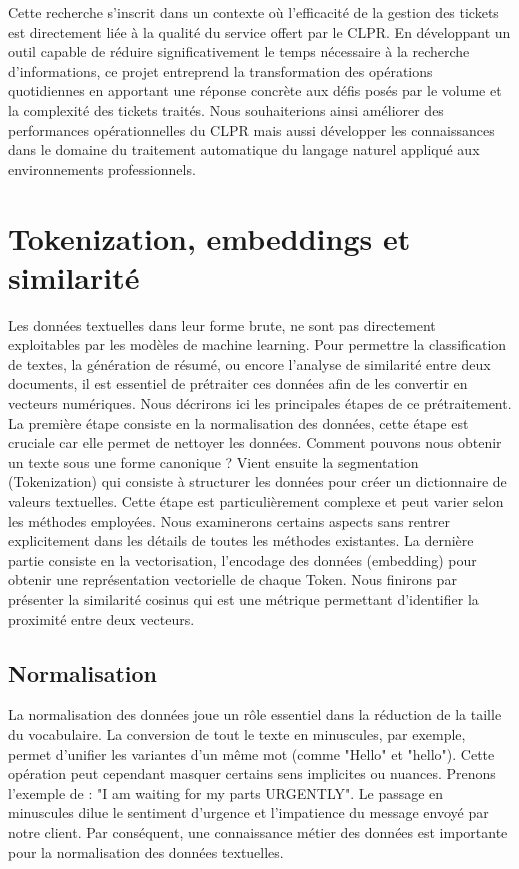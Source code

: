 \documentclass[12pt]{article}
\theoremstyle{definition}
\begin{document}
	Cette recherche s'inscrit dans un contexte où l'efficacité de la gestion des tickets est directement liée à la qualité du service offert par le CLPR. En développant un outil capable de réduire significativement le temps nécessaire à la recherche d'informations, ce projet entreprend la transformation des opérations quotidiennes en apportant une réponse concrète aux défis posés par le volume et la complexité des tickets traités. Nous souhaiterions ainsi améliorer des performances opérationnelles du CLPR mais aussi développer les connaissances dans le domaine du traitement automatique du langage naturel appliqué aux environnements professionnels.	

	
	\section{Tokenization, embeddings et similarité}
	Les données textuelles dans leur forme brute, ne sont pas directement exploitables par les modèles de machine learning. Pour permettre la classification de textes, la génération de résumé, ou encore l'analyse de similarité entre deux documents, il est essentiel de prétraiter ces données afin de les convertir en vecteurs numériques. Nous décrirons ici les principales étapes de ce prétraitement. La première étape consiste en la normalisation des données, cette étape est cruciale car elle permet de nettoyer les données. Comment pouvons nous obtenir un texte sous une forme canonique ? Vient ensuite la segmentation (Tokenization) qui consiste à structurer les données pour créer un dictionnaire de valeurs textuelles. Cette étape est particulièrement complexe et peut varier selon les méthodes employées. Nous examinerons certains aspects sans rentrer explicitement dans les détails de toutes les méthodes existantes. La dernière partie consiste en la vectorisation, l'encodage des données (embedding) pour obtenir une représentation vectorielle de chaque Token. Nous finirons par présenter la similarité cosinus qui est une métrique permettant d'identifier la proximité entre deux vecteurs.
	\subsection{Normalisation}
	La normalisation des données joue un rôle essentiel dans la réduction de la taille du vocabulaire. La conversion de tout le texte en minuscules, par exemple, permet d'unifier les variantes d'un même mot (comme "Hello" et "hello"). Cette opération peut cependant masquer certains sens implicites ou nuances. Prenons l'exemple de : "I am waiting for my parts URGENTLY". Le passage en minuscules dilue le sentiment d'urgence et l'impatience du message envoyé par notre client. Par conséquent, une connaissance métier des données est importante pour la normalisation des données textuelles.  
	
\end{document}
